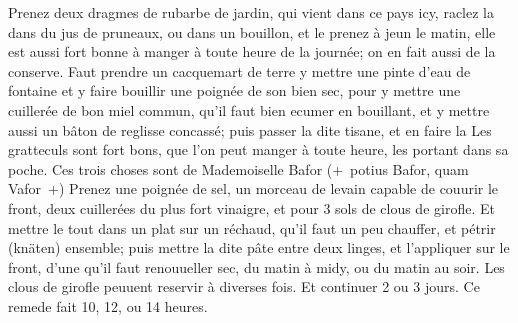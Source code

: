 \pend%
\pstart%
Prenez deux dragmes de rubarbe\protect{} de jardin, qui vient dans ce pays icy, raclez la dans du jus de pruneaux,\protect{}
ou dans un bouillon, et le prenez \`{a} jeun le matin, elle est aussi fort bonne \`{a} manger \`{a} toute heure de la journ\'{e}e; on en fait aussi de la conserve.
\pend%
\pstart%
\protect{}%
\protect{}
Faut prendre un cacquemart de terre
y mettre une pinte d'eau de fontaine et y faire bouillir une poign\'{e}e de son\protect{} bien sec, pour y mettre une cuiller\'{e}e de bon miel\protect{} commun, qu'il faut bien ecumer en bouillant, et y mettre aussi un b\^{a}ton de reglisse\protect{} concass\'{e}; puis passer la dite tisane,\protect{} et en faire la
\pend%
\pstart%
Les gratteculs\protect{} sont fort bons, que l'on peut manger \`{a} toute heure, les portant dans sa poche. Ces trois choses sont de Mademoiselle Bafor\protect{}
(+~potius Bafor, quam Vafor~+)%
\pend%
\pstart%
\protect{}%
\protect{}
Prenez une poign\'{e}e de sel,\protect{} un morceau de levain\protect{} capable de couurir le front, deux cuiller\'{e}es du plus fort vinaigre\protect{}, et pour 3 sols de clous de girofle\protect{}. Et mettre le tout dans 
\pend
\newpage
\pstart\noindent un plat sur un r\'{e}chaud, qu'il faut un peu chauffer, et p\'{e}trir (kn\"{a}ten) ensemble; puis mettre la dite p\^{a}te entre deux linges, et l'appliquer sur le front, d'une
qu'il faut renouueller
sec, du matin \`{a} midy, ou du matin au soir. Les clous de girofle\protect{} peuuent reservir \`{a} diverses fois. Et continuer 2 ou 3 jours. Ce remede fait  10, 12, ou 14 heures.
